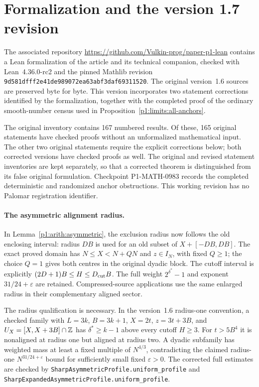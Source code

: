 \clearpage
\section*{Formalization and the version 1.7 revision}

The associated repository
\url{https://github.com/Vulkin-prog/paper-p1-lean}
contains a Lean formalization of the article and its technical companion, checked
with Lean~4.36.0-rc2 and the pinned Mathlib revision
\texttt{9d581dfff2e41de989072ea63abf3daf69311520}.
The original version~1.6 sources are preserved byte for byte.
This version incorporates two statement corrections identified by the
formalization, together with the completed proof of the ordinary
smooth-number census used in Proposition~\ref{p1:limits:all-anchors}.

The original inventory contains 167 numbered results.  Of these,
165 original statements have checked proofs without an unformalized
mathematical input.  The other two original statements require the
explicit corrections below; both corrected versions have checked
proofs as well.  The original and revised statement inventories are
kept separately, so that a corrected theorem is distinguished from
its false original formulation.  Checkpoint P1-MATH-0983 records the
completed deterministic and randomized anchor obstructions.
This working revision has no Palomar registration identifier.

\paragraph{The asymmetric alignment radius.}
In Lemma~\ref{p1:arith:asymmetric}, the exclusion radius now follows the
old enclosing interval: radius $DB$ is used for an old subset of
$X+[-DB,DB]$.  The exact proved domain has
$N\leq X<N+QN$ and $z\in I_N$, with fixed $Q\geq1$;
the choice $Q=1$ gives both centres in the original dyadic block.
The cutoff interval is explicitly
$(2D+1)B\leq H\leq D_{\rm cut}B$.
The full weight $2^{\delta^*}-1$ and exponent $31/24+\varepsilon$
are retained.  Compressed-source applications use the same enlarged
radius in their complementary aligned sector.

The radius qualification is necessary.  In the version~1.6 radius-one
convention, a checked family with $L=3k$, $B=3k+1$,
$X=2t$, $z=3t+3B$, and $U_X=[X,X+3B]\cap\mathbb Z$ has
$\delta^*\geq k-1$ above every cutoff $H\geq3$.
For $t>5B^4$ it is nonaligned at radius one but aligned at radius two.
A dyadic subfamily has weighted mass at least a fixed multiple of
$N^{4/3}$, contradicting the claimed radius-one
$N^{31/24+\varepsilon}$ bound for sufficiently small fixed
$\varepsilon>0$.
The corrected full estimates are checked by
\texttt{SharpAsymmetricProfile.uniform\_profile} and
\texttt{SharpExpandedAsymmetricProfile.uniform\_profile}.

